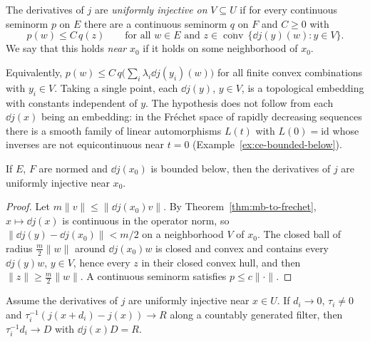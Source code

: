 \begin{definition}
  \label{def:equi-embedding}
  \leanok
  The derivatives of $j$ are \emph{uniformly injective on} $V \subseteq U$ if for every
  continuous seminorm $p$ on $E$ there are a continuous seminorm $q$ on $F$ and $C \ge 0$ with
  \[
    p(w) \le C\, q(z) \qquad \text{for all } w \in E \text{ and }
    z \in \overline{\operatorname{conv}}\,\{\dd j(y)(w) : y \in V\}.
  \]
  We say that this holds \emph{near} $x_0$ if it holds on some neighborhood of $x_0$.
\end{definition}

Equivalently, $p(w) \le C\, q\bigl(\sum_i \lambda_i \dd j(y_i)(w)\bigr)$ for all finite convex
combinations with $y_i \in V$. Taking a single point, each $\dd j(y)$, $y \in V$, is a
topological embedding with constants independent of $y$. The hypothesis does not follow from
each $\dd j(x)$ being an embedding: in the Fr\'echet space of rapidly decreasing sequences
there is a smooth family of linear automorphisms $L(t)$ with $L(0) = \mathrm{id}$ whose inverses
are not equicontinuous near $t = 0$
(Example~\ref{ex:ce-bounded-below}).

\begin{lemma}
  \label{lem:equi-embedding-normed}
  \leanok
  If $E$, $F$ are normed and $\dd j(x_0)$ is bounded below, then the derivatives of $j$ are
  uniformly injective near $x_0$.
\end{lemma}

\begin{proof}
  \leanok
  Let $m\|v\| \le \|\dd j(x_0) v\|$. By Theorem~\ref{thm:mb-to-frechet}, $x \mapsto \dd j(x)$
  is continuous in the operator norm, so $\|\dd j(y) - \dd j(x_0)\| < m/2$ on a neighborhood
  $V$ of $x_0$. The closed ball of radius $\frac m2\|w\|$ around $\dd j(x_0) w$ is closed and
  convex and contains every $\dd j(y) w$, $y \in V$, hence every $z$ in their closed convex
  hull, and then $\|z\| \ge \frac m2 \|w\|$. A continuous seminorm satisfies $p \le c\|\cdot\|$.
\end{proof}

\begin{lemma}
  \label{lem:equi-embedding-quotient}
  \leanok
  Assume the derivatives of $j$ are uniformly injective near $x \in U$. If $d_i \to 0$,
  $\tau_i \ne 0$ and $\tau_i^{-1}(j(x + d_i) - j(x)) \to R$ along a countably generated filter,
  then $\tau_i^{-1} d_i \to D$ with $\dd j(x) D = R$.
\end{lemma}

